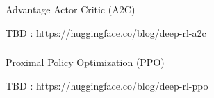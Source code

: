 \begin{frame}[fragile]\frametitle{}
\begin{center}
{\Large Advantage Actor Critic (A2C)}
\end{center}

TBD : https://huggingface.co/blog/deep-rl-a2c
\end{frame}


\begin{frame}[fragile]\frametitle{}
\begin{center}
{\Large Proximal Policy Optimization (PPO)}
\end{center}

TBD : https://huggingface.co/blog/deep-rl-ppo

\end{frame}



